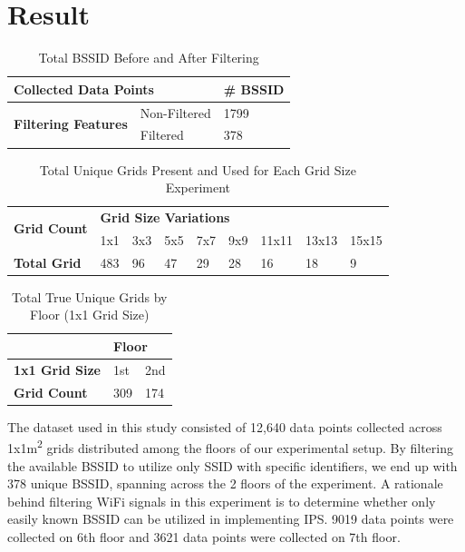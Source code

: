 \documentclass[runningheads]{llncs}
\begin{document}
\section{Result}
\vspace{-15pt}
\begin{table}[htbp]
	\caption{Total BSSID Before and After Filtering}
	\label{tab:bssid_counts}
	\centering
	\begin{tabular}{|l|l|l|}
		\hline
		\multicolumn{2}{|l|}{\textbf{Collected Data Points}} & \textbf{\# BSSID} \\
		\hline
		\multirow{2}{*}{\textbf{Filtering Features}} & Non-Filtered & 1799 \\
		\cline{2-3}
		& Filtered & 378 \\
		\hline
	\end{tabular}
\end{table}
\vspace{-15pt}
\begin{table}[htbp]
	\caption{Total Unique Grids Present and Used for Each Grid Size Experiment}
	\label{tab:grid_size_variations}
	\centering
	\begin{tabular}{|l|l|l|l|l|l|l|l|l|} 
		\hline
		\multirow{2}{*}{\textbf{Grid Count }} & \multicolumn{8}{l|}{\textbf{Grid Size Variations}}   \\ 
		\cline{2-9}
		& 1x1 & 3x3 & 5x5 & 7x7 & 9x9 & 11x11 & 13x13 & 15x15  \\ 
		\hline
		\textbf{Total Grid}                   & 483 & 96  & 47  & 29  & 28  & 16    & 18    & 9      \\
		\hline
	\end{tabular}
\end{table}
\vspace{-15pt}
\begin{table}[htbp]
	\caption{Total True Unique Grids by Floor (1x1 Grid Size)}
	\label{tab:true_unique_grid}
	\centering
	\begin{tabular}{|l|l|l|} 
		\hline
		& \multicolumn{2}{l|}{\textbf{Floor}}  \\ 
		\hline
		\textbf{1x1 Grid Size} & 1st & 2nd                            \\ 
		\hline
		\textbf{Grid Count}    & 309 & 174                            \\
		\hline
	\end{tabular}
\end{table}

The dataset used in this study consisted of 12,640 data points collected across 1x1m\textsuperscript{2} grids distributed among the floors of our experimental setup. By filtering the available BSSID to utilize only SSID with specific identifiers, we end up with 378 unique BSSID, spanning across the 2 floors of the experiment. A rationale behind filtering WiFi signals in this experiment is to determine whether only easily known BSSID can be utilized in implementing IPS. 9019 data points were collected on 6th floor and 3621 data points were collected on 7th floor.
\end{document}
